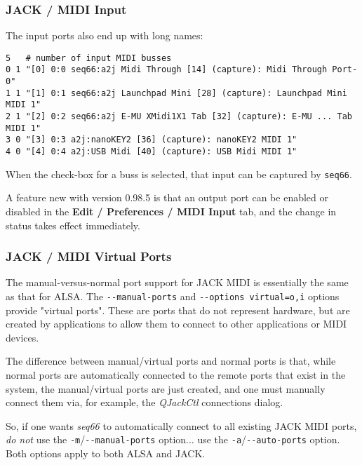 \subsubsection{JACK / MIDI Input}
\label{subsubsec:jack_midi_input}

   The input ports also end up with long names:

   \begin{verbatim}
5   # number of input MIDI busses
0 1 "[0] 0:0 seq66:a2j Midi Through [14] (capture): Midi Through Port-0"
1 1 "[1] 0:1 seq66:a2j Launchpad Mini [28] (capture): Launchpad Mini MIDI 1"
2 1 "[2] 0:2 seq66:a2j E-MU XMidi1X1 Tab [32] (capture): E-MU ... Tab MIDI 1"
3 0 "[3] 0:3 a2j:nanoKEY2 [36] (capture): nanoKEY2 MIDI 1"
4 0 "[4] 0:4 a2j:USB Midi [40] (capture): USB Midi MIDI 1"
   \end{verbatim}

   When the check-box for a buss is selected, that input can be captured by
   \texttt{seq66}.

   A feature new with version 0.98.5 is that an output port can be enabled or
   disabled in the 
	\textbf{Edit / Preferences / MIDI Input} tab,
   and the change in status takes effect immediately.

\subsubsection{JACK / MIDI Virtual Ports}
\label{subsubsec:jack_midi_virtual_ports}

   The manual-versus-normal port support for JACK MIDI is essentially the same
   as that for ALSA.
   The \texttt{-{}-manual-ports} and
   \texttt{-{}-options virtual=o,i} options provide
   "virtual ports".  These are ports that do not represent
   hardware, but are created by applications to allow them to connect to other
   applications or MIDI devices.

   The difference between manual/virtual ports and normal ports is that, while
   normal ports are automatically connected to the remote ports that exist in
   the system, the manual/virtual ports are just created, and one must
   manually connect them via, for example, the
   \textsl{QJackCtl} connections dialog.

   So, if one wants \textsl{seq66} to automatically connect to all existing
   JACK MIDI ports, \textsl{do not} use the
   \texttt{-m}/\texttt{-{}-manual-ports} option... use the
   \texttt{-a}/\texttt{-{}-auto-ports} option.  Both options apply to both
   ALSA and JACK.

